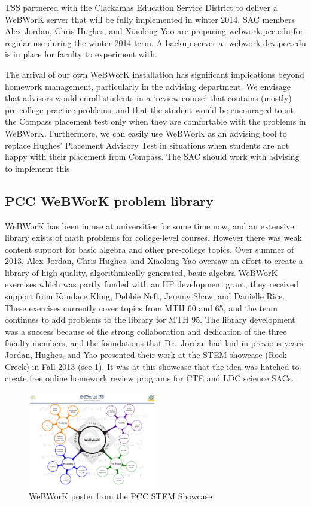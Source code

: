 TSS partnered with the Clackamas Education Service District to deliver a WeBWorK server that will be fully implemented in winter 2014.  SAC members Alex Jordan, Chris Hughes, and Xiaolong Yao are preparing \href{http://webwork.pcc.edu}{webwork.pcc.edu} for regular use during the winter 2014 term. A backup server at \href{http://webwork-dev.pcc.edu}{webwork-dev.pcc.edu} is in place for faculty to experiment with. 

The arrival of our own WeBWorK installation has significant implications beyond homework management, particularly in the advising department. We envisage that advisors would enroll students in a `review course' that contains (mostly) pre-college practice problems, and that the student would be encouraged to sit the Compass placement test only when they are comfortable with the problems in WeBWorK. Furthermore, we can easily use WeBWorK as an advising tool to replace Hughes' Placement Advisory Test in situations when students are not happy with their placement from Compass.  The SAC should work with advising to implement this. 

\subsection{PCC WeBWorK problem library}
WeBWorK has been in use at universities for some time now, and an extensive library exists of math problems for college-level courses. However there was weak content support for basic algebra and other pre-college topics. Over summer of 2013, Alex Jordan, Chris Hughes, and Xiaolong Yao oversaw an effort to create a library of high-quality, algorithmically generated, basic algebra WeBWorK exercises which was partly funded with an IIP development grant; they received support from Kandace Kling, Debbie Neft, Jeremy Shaw, and Danielle Rice.  These exercises currently cover topics from MTH 60 and 65, and the team continues to add problems to the library for MTH 95. The library development was a success because of the strong collaboration and dedication of the three faculty members, and the foundations that Dr.\ Jordan had laid in previous years. Jordan, Hughes, and Yao presented their work at the STEM showcase (Rock Creek) in Fall 2013 (see \cref{other:fig:webworkposter}). It was at this showcase that the idea was hatched to create free online homework review programs for CTE and LDC science SACs.

\begin{figure}[!htb]
	\centering
	\includegraphics[width=0.5\textwidth]{webworkposter}
	\caption{WeBWorK poster from the PCC STEM Showcase}\label{other:fig:webworkposter}
\end{figure}

